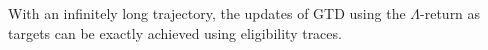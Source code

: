 \documentclass{article}
\begin{document}

\begin{fact}
With an infinitely long trajectory, the updates of GTD \cite{sutton2009fast} using the $\Lambda$-return as targets can be exactly achieved using eligibility traces.
\end{fact}
\end{document}
